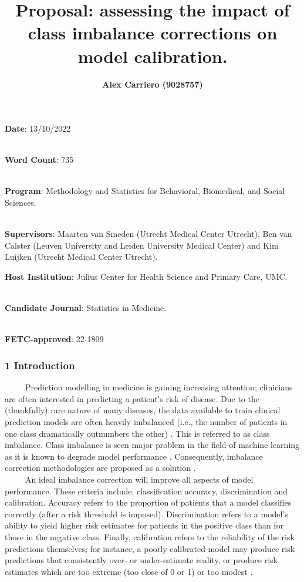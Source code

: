 \documentclass[
  12pt,
]{article}
\title{\textbf{Proposal: assessing the impact of class imbalance
corrections on model calibration.}}
\author{\textbf{Alex Carriero (9028757) \vspace{4in}}}
\date{}
\begin{document}
\maketitle

\textbf{Date}: 13/10/2022\\
\strut \\
\textbf{Word Count}: 735\\
\strut \\
\textbf{Program}: Methodology and Statistics for Behavioral, Biomedical,
and Social Sciences.\\
\strut \\
\textbf{Supervisors}: Maarten van Smeden (Utrecht Medical Center
Utrecht), Ben van Calster (Leuven University and Leiden University
Medical Center) and Kim Luijken (Utrecht Medical Center Utrecht).

\textbf{Host Institution}: Julius Center for Health Science and Primary
Care, UMC.\\
\strut \\
\textbf{Candidate Journal}: Statistics in Medicine.\\
\strut \\
\textbf{FETC-approved}: 22-1809

\newpage

\hypertarget{introduction}{%
\subsubsection{1 \textbar{} Introduction}\label{introduction}}

~~~~~Prediction modelling in medicine is gaining increasing attention;
clinicians are often interested in predicting a patient's risk of
disease. Due to the (thankfully) rare nature of many diseases, the data
available to train clinical prediction models are often heavily
imbalanced (i.e., the number of patients in one class dramatically
outnumbers the other) \autocite{summary_m}. This is referred to as class
imbalance. Class imbalance is seen major problem in the field of machine
learning as it is known to degrade model performance \autocite{yu}.
Consequently, imbalance correction methodologies are proposed as a
solution \autocite{yu}.\\

~~~~~An ideal imbalance correction will improve all aspects of model
performance. These criteria include: classification accuracy,
discrimination and calibration. Accuracy refers to the proportion of
patients that a model classifies correctly (after a risk threshold is
imposed). Discrimination refers to a model's ability to yield higher
risk estimates for patients in the positive class than for those in the
negative class. Finally, calibration refers to the reliability of the
risk predictions themselves; for instance, a poorly calibrated model may
produce risk predictions that consistently over- or under-estimate
reality, or produce risk estimates which are too extreme (too close of 0
or 1) or too modest \autocite{achilles}.\\
\end{document}
